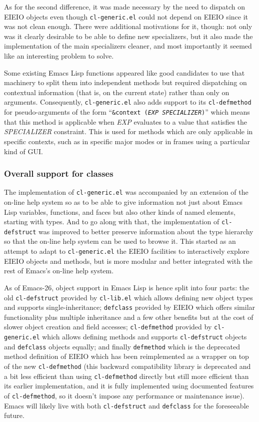 \documentclass[format=acmsmall, review]{acmart}
\newcommand \Elisp {Emacs Lisp}
\newcommand \id[1] {\textrm{\textsl{#1}}}
\begin{document}
As for the second difference, it was made necessary by the need to dispatch
on EIEIO objects even though \texttt{cl-generic.el} could not depend on
EIEIO since it was not clean enough.  There were additional motivations for
it, though: not only was it clearly desirable to be able to define new
specializers, but it also made the implementation of the main specializers
cleaner, and most importantly it seemed like an interesting problem
to solve.

Some existing \Elisp{} functions appeared like good candidates to use that
machinery to split them into independent methods but required dispatching
on contextual information (that is, on the current state) rather than only on
arguments.  Consequently, \texttt{cl-generic.el} also adds support to its
\texttt{cl-defmethod} for pseudo-arguments of the form ``\texttt{\&context
  (\id{EXP} \id{SPECIALIZER})}'' which means that this method is
applicable when \id{EXP} evaluates to a value that satisfies the
\id{SPECIALIZER} constraint.  This is used for methods which
are only applicable in specific contexts, such as in specific major modes or
in frames using a particular kind of GUI.

\subsubsection{Overall support for classes}

The implementation of \texttt{cl-generic.el} was accompanied by an extension
of the on-line help system so as to be able to give information not just
about \Elisp{} variables, functions, and faces but also other kinds of named
elements, starting with types.  And to go along with that, the implementation
of \texttt{cl-defstruct} was improved to better preserve information about
the type hierarchy so that the on-line help system can be used to browse
it.  This started as an attempt to adapt to \texttt{cl-generic.el} the EIEIO
facilities to interactively explore EIEIO objects and methods, but is more
modular and better integrated with the rest of Emacs's on-line help system.

As of Emacs-26, object support in \Elisp{} is hence split into four parts: the
old \texttt{cl-defstruct} provided by \texttt{cl-lib.el} which allows
defining new object types and supports single-inheritance; \texttt{defclass}
provided by EIEIO which offers similar functionality plus multiple
inheritance and a few other benefits but at the cost of slower object
creation and field accesses; \texttt{cl-defmethod} provided by
\texttt{cl-generic.el} which allows defining methods and supports
\texttt{cl-defstruct} objects and \texttt{defclass} objects equally; and finally
\texttt{defmethod} which is the deprecated method definition of EIEIO which
has been reimplemented as a wrapper on top of the new \texttt{cl-defmethod}
(this backward compatibility library is deprecated and a bit less efficient
than using \texttt{cl-defmethod} directly but still more efficient than its
earlier implementation, and it is fully implemented using documented features
of \texttt{cl-defmethod}, so it doesn't impose any performance or
maintenance issue).  Emacs will likely live with both \texttt{cl-defstruct} and
\texttt{defclass} for the foreseeable future.
\end{document}
